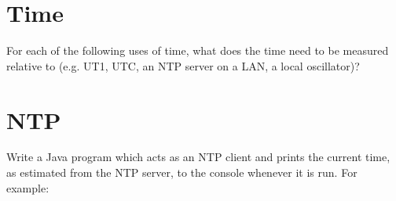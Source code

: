 \documentclass{supervision}
\begin{document}
\begin{questions}
    \section*{Time}
    \question For each of the following uses of time, what does the time need
      to be measured relative to (e.g. UT1, UTC, an NTP server on a LAN, a
      local oscillator)?

    \section*{NTP}
    \question Write a Java program which acts as an NTP client and prints the
      current time, as estimated from the NTP server, to the console whenever
      it is run. For example:


\end{questions}
\end{document}
